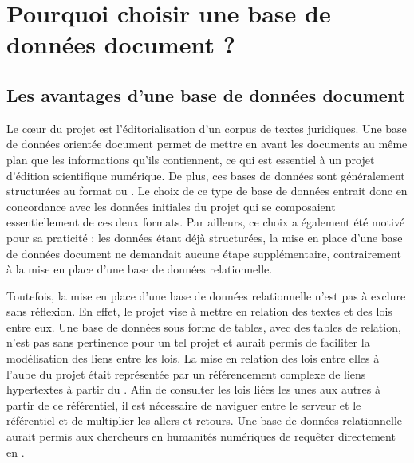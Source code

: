 \section{Pourquoi choisir une base de données document ? }
    \subsection{Les avantages d’une base de données document}
    
Le c\oe ur du projet \COREL est l'éditorialisation d'un corpus de textes juridiques. Une base de données orientée document permet de mettre en avant les documents au même plan que les informations qu'ils contiennent, ce qui est essentiel à un projet d'édition scientifique numérique. De plus, ces bases de données sont généralement structurées au format \XML ou \JSON. Le choix de ce type de base de données entrait donc en concordance avec les données initiales du projet qui se composaient essentiellement de ces deux formats. Par ailleurs, ce choix a également été motivé pour sa praticité : les données étant déjà structurées, la mise en place d'une base de données document ne demandait aucune étape supplémentaire, contrairement à la mise en place d'une base de données relationnelle. 

Toutefois, la mise en place d'une base de données relationnelle n'est pas à exclure sans réflexion. En effet, le projet \COREL vise à mettre en relation des textes et des lois entre eux. Une base de données sous forme de tables, avec des tables de relation, n'est pas sans pertinence pour un tel projet et aurait permis de faciliter la modélisation des liens entre les lois. La mise en relation des lois entre elles à l'aube du projet était représentée par un référencement complexe de liens hypertextes à partir du \genyuan. Afin de consulter les lois liées les unes aux autres à partir de ce référentiel, il est nécessaire de naviguer entre le serveur \IIIF et le référentiel et de multiplier les allers et retours. Une base de données relationnelle aurait permis aux chercheurs en humanités numériques de requêter directement en \SQL. 

